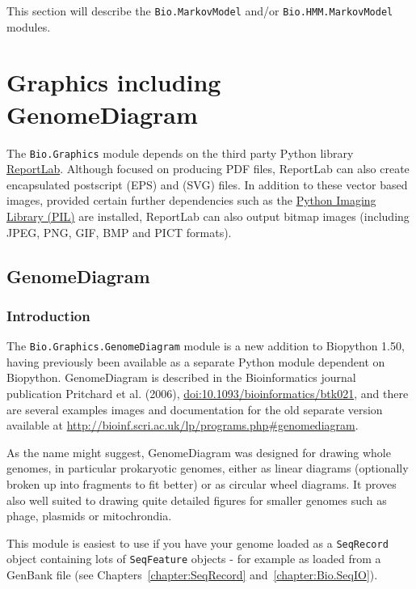 \documentclass{report}
\begin{document}
This section will describe the \verb|Bio.MarkovModel| and/or \verb|Bio.HMM.MarkovModel| modules.

\chapter{Graphics including GenomeDiagram}
\label{chapter:graphics}

The \verb|Bio.Graphics| module depends on the third party Python library
\href{http://www.reportlab.org}{ReportLab}.  Although focused on producing PDF files,
ReportLab can also create encapsulated postscript (EPS) and (SVG) files.  In addition
to these vector based images, provided certain further dependencies such as the
\href{http://www.pythonware.com/products/pil/}{Python Imaging Library (PIL)} are
installed, ReportLab can also output bitmap images (including JPEG, PNG, GIF, BMP
and PICT formats).

\section{GenomeDiagram}
\label{sec:genomediagram}
\subsection{Introduction}

The \verb|Bio.Graphics.GenomeDiagram| module is a new addition to Biopython 1.50,
having previously been available as a separate Python module dependent on Biopython.
GenomeDiagram is described in the Bioinformatics journal publication Pritchard et al. (2006),
\href{http://dx.doi.org/10.1093/bioinformatics/btk021}{doi:10.1093/bioinformatics/btk021},
and there are several examples images and documentation for the old separate version
available at \url{http://bioinf.scri.ac.uk/lp/programs.php#genomediagram}.

As the name might suggest, GenomeDiagram was designed for drawing whole genomes, in
particular prokaryotic genomes, either as linear diagrams (optionally broken up into
fragments to fit better) or as circular wheel diagrams.  It proves also well suited
to drawing quite detailed figures for smaller genomes such as phage, plasmids or
mitochrondia.

This module is easiest to use if you have your genome loaded as a \verb|SeqRecord|
object containing lots of \verb|SeqFeature| objects - for example as loaded from a
GenBank file (see Chapters~\ref{chapter:SeqRecord} and~\ref{chapter:Bio.SeqIO}).
\end{document}
